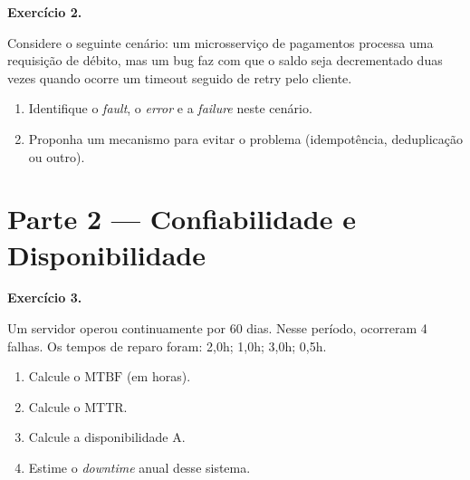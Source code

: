 \documentclass[12pt,a4paper]{article}
\newif\ifgabarito
\newcommand{\A}{\mathrm{A}}
\newcommand{\MTBF}{\mathrm{MTBF}}
\newcommand{\MTTR}{\mathrm{MTTR}}
\newcommand{\questao}[2][8]{%
  \needspace{#1\baselineskip}%
  \noindent\textbf{Exercício #2.}%
}
\begin{document}
\ifgabarito
\begin{tcolorbox}[gabarito]
Alternativa \textbf{(B)}. O \textit{fault} é latente; é ativado e gera um \textit{error} (estado interno incorreto); o \textit{error} pode ou não propagar-se até uma \textit{failure} (serviço incorreto observável). As demais alternativas invertem a ordem ou confundem os conceitos.
\end{tcolorbox}
\fi

\vspace{8pt}

\questao[8]{2}
Considere o seguinte cenário: um microsserviço de pagamentos processa uma requisição de débito, mas um bug faz com que o saldo seja decrementado duas vezes quando ocorre um timeout seguido de retry pelo cliente.
\begin{enumerate}[label=\alph*)]
  \item Identifique o \textit{fault}, o \textit{error} e a \textit{failure} neste cenário.
  \item Proponha um mecanismo para evitar o problema (idempotência, deduplicação ou outro).
\end{enumerate}

\ifgabarito
\begin{tcolorbox}[gabarito]
\begin{enumerate}[label=\alph*),nosep]
  \item \textit{Fault}: bug que não garante idempotência no débito durante retry. \textit{Error}: estado inconsistente do saldo (decrementado duas vezes). \textit{Failure}: cobrança duplicada entregue ao cliente.
  \item Idempotência com \textit{idempotency key}: antes de debitar, verificar se o \texttt{pedido\_id} já consta na tabela de deduplicação; se sim, retornar resultado anterior sem novo débito.
\end{enumerate}
\end{tcolorbox}
\fi

\vspace{8pt}

\section{Parte 2 --- Confiabilidade e Disponibilidade}

\questao[9]{3}
Um servidor operou continuamente por 60 dias. Nesse período, ocorreram 4 falhas. Os tempos de reparo foram: 2,0h; 1,0h; 3,0h; 0,5h.
\begin{enumerate}[label=\alph*)]
  \item Calcule o $\MTBF$ (em horas).
  \item Calcule o $\MTTR$.
  \item Calcule a disponibilidade $\A$.
  \item Estime o \textit{downtime} anual desse sistema.
\end{enumerate}
\end{document}
